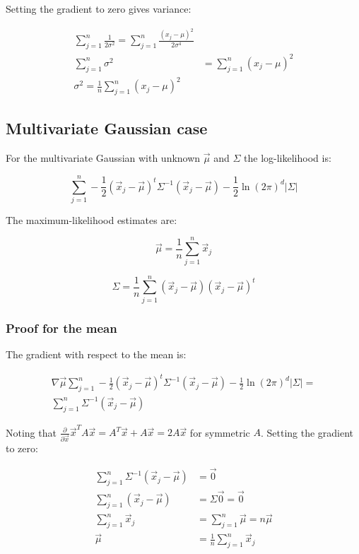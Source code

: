 		Setting the gradient to zero gives variance:

		\begin{align*}
			\sum\limits_{j=1}^n\frac{1}{2\sigma^2} = \sum\limits_{j=1}^n\frac{(x_j-\mu)^2}{2\sigma^4}\\
			\sum\limits_{j=1}^n\sigma^2 &= \sum\limits_{j=1}^n(x_j-\mu)^2\\
			\sigma^2 = \frac{1}{n}\sum\limits_{j=1}^n(x_j-\mu)^2
		\end{align*}

	\subsection{Multivariate Gaussian case}
	For the multivariate Gaussian with unknown $\vec{\mu}$ and $\Sigma$ the log-likelihood is:

	$$\sum\limits_{j=1}^n-\frac{1}{2}(\vec{x}_j -\vec{\mu})^t\Sigma^{-1}(\vec{x}_j - \vec{\mu}) - \frac{1}{2}\ln(2\pi)^d|\Sigma|$$

	The maximum-likelihood estimates are:

	$$\vec{\mu} = \frac{1}{n}\sum\limits_{j=1}^n\vec{x}_j$$

	$$\Sigma = \frac{1}{n}\sum\limits_{j=1}^n(\vec{x}_j-\vec{\mu})(\vec{x}_j-\vec{\mu})^t$$

		\subsubsection{Proof for the mean}
		The gradient with respect to the mean is:

		\begin{align*}
			\nabla\vec{\mu}\sum\limits_{j=1}^n-\frac{1}{2}(\vec{x}_j-\vec{\mu})^t\Sigma^{-1}(\vec{x}_j-\vec{\mu})-\frac{1}{2}\ln(2\pi)^d|\Sigma|=\\
			\sum\limits_{j=1}^n\Sigma^{-1}(\vec{x}_j-\vec{\mu})
		\end{align*}

		Noting that $\frac{\partial}{\partial\vec{x}}\vec{x}^TA\vec{x} = A^T\vec{x}+A\vec{x} = 2A\vec{x}$ for symmetric $A$.
		Setting the gradient to zero:

		\begin{align*}
			\sum\limits_{j=1}^n\Sigma^{-1}(\vec{x}_j-\vec{\mu}) &=\vec{0}\\
			\sum\limits_{j=1}^n(\vec{x}_j-\vec{\mu}) &=\Sigma\vec{0} = \vec{0}\\
			\sum\limits_{j=1}^n\vec{x}_j &=\sum\limits_{j=1}^n\vec{\mu} = n\vec{\mu}\\
			\vec{\mu} &=\frac{1}{n}\sum\limits_{j=1}^n\vec{x}_j
		\end{align*}

